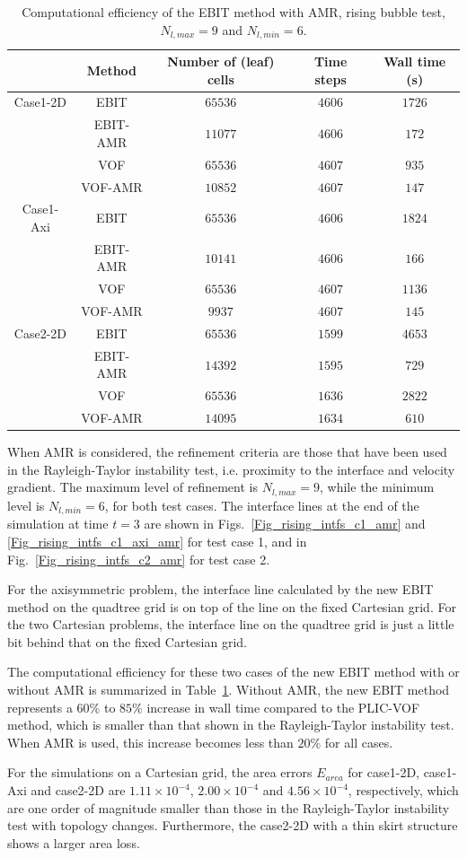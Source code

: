 \begin{table}[hbt!]
\caption{Computational efficiency of the EBIT method with AMR, rising bubble test, $N_{l,max}=9$ and $N_{l,min}=6$.}
\centering
\begin{tabular}{ccccc}
\hline 
 &Method & Number of (leaf) cells & Time steps & Wall time (s) \\ 
\hline 
Case1-2D& EBIT & $65536$ & $4606$ & $1726$ \\ 
&EBIT-AMR & $11077$ & $4606$ & $172$ \\ 
&VOF & $65536$ & $4607$ & $935$ \\ 
&VOF-AMR & $10852$ & $4607$ & $147$ \\ 
\hline 
Case1-Axi & EBIT & $65536$ & $4606$ & $1824$ \\ 
&EBIT-AMR & $10141$ & $4606$ & $166$ \\ 
&VOF & $65536$ & $4607$ & $1136$ \\ 
&VOF-AMR & $9937$ & $4607$ & $145$ \\ 
\hline 
Case2-2D& EBIT & $65536$ & $1599$ & $4653$ \\ 
&EBIT-AMR & $14392$ & $1595$ & $729$ \\ 
&VOF & $65536$ & $1636$ & $2822$ \\ 
&VOF-AMR & $14095$ & $1634$ & $610$ \\ 
\hline 
\end{tabular}
\label{Tab_rising_amr}
\end{table}

When AMR is considered, the refinement criteria are those that have been used in the Rayleigh-Taylor instability test, i.e. proximity to the interface and velocity gradient. 
The maximum level of refinement is $N_{l,max}=9$, while the minimum level is $N_{l,min}=6$, for both test cases.
The interface lines at the end of the simulation at time $t = 3$ are shown in Figs.~\ref{Fig_rising_intfs_c1_amr} and \ref{Fig_rising_intfs_c1_axi_amr} for test case 1, and
in Fig.~\ref{Fig_rising_intfs_c2_amr} for test case 2.

For the axisymmetric problem, the interface line calculated by the new EBIT method on the quadtree grid is on top of the line on the fixed Cartesian grid. For the two Cartesian problems, the interface line on the quadtree grid is just a little bit behind that on the fixed Cartesian grid.

The computational efficiency for these two cases of the new EBIT method with
or without AMR is summarized in Table~\ref{Tab_rising_amr}. Without AMR, the new EBIT method represents a $60\%$ to $85\%$ increase in wall time compared to the PLIC-VOF method, which is smaller than that shown in the Rayleigh-Taylor instability test. When AMR is used, this increase becomes less than $20\%$ for all cases.

For the simulations on a Cartesian grid, the area errors $E_{area}$ for case1-2D, case1-Axi and case2-2D are $1.11 \times 10^{-4}$, $2.00 \times 10^{-4}$ and $4.56 \times 10^{-4}$, respectively, which are one order of magnitude smaller than those in the Rayleigh-Taylor instability test with topology changes. Furthermore, the case2-2D with a thin skirt structure shows a larger area loss.